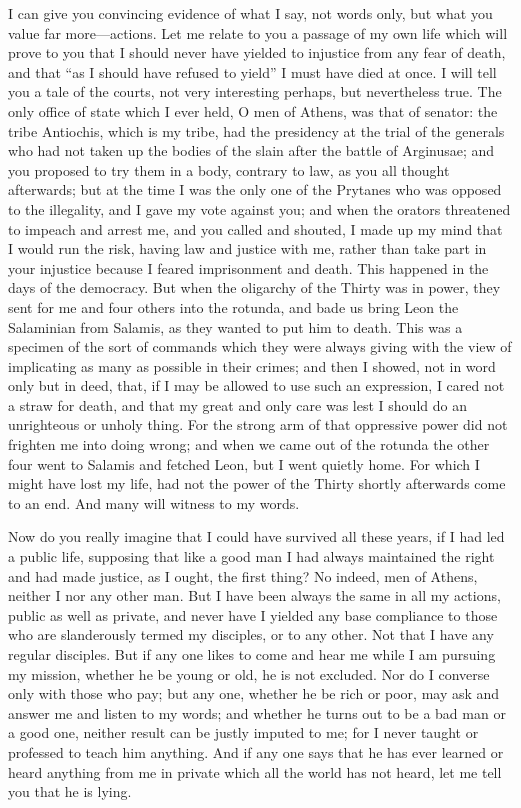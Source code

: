 \documentclass[11pt,letter]{article}
\begin{document}
\par  I can give you convincing evidence of what I say, not words only, but what you value far more—actions. Let me relate to you a passage of my own life which will prove to you that I should never have yielded to injustice from any fear of death, and that “as I should have refused to yield” I must have died at once. I will tell you a tale of the courts, not very interesting perhaps, but nevertheless true. The only office of state which I ever held, O men of Athens, was that of senator: the tribe Antiochis, which is my tribe, had the presidency at the trial of the generals who had not taken up the bodies of the slain after the battle of Arginusae; and you proposed to try them in a body, contrary to law, as you all thought afterwards; but at the time I was the only one of the Prytanes who was opposed to the illegality, and I gave my vote against you; and when the orators threatened to impeach and arrest me, and you called and shouted, I made up my mind that I would run the risk, having law and justice with me, rather than take part in your injustice because I feared imprisonment and death. This happened in the days of the democracy. But when the oligarchy of the Thirty was in power, they sent for me and four others into the rotunda, and bade us bring Leon the Salaminian from Salamis, as they wanted to put him to death. This was a specimen of the sort of commands which they were always giving with the view of implicating as many as possible in their crimes; and then I showed, not in word only but in deed, that, if I may be allowed to use such an expression, I cared not a straw for death, and that my great and only care was lest I should do an unrighteous or unholy thing. For the strong arm of that oppressive power did not frighten me into doing wrong; and when we came out of the rotunda the other four went to Salamis and fetched Leon, but I went quietly home. For which I might have lost my life, had not the power of the Thirty shortly afterwards come to an end. And many will witness to my words.

\par  Now do you really imagine that I could have survived all these years, if I had led a public life, supposing that like a good man I had always maintained the right and had made justice, as I ought, the first thing? No indeed, men of Athens, neither I nor any other man. But I have been always the same in all my actions, public as well as private, and never have I yielded any base compliance to those who are slanderously termed my disciples, or to any other. Not that I have any regular disciples. But if any one likes to come and hear me while I am pursuing my mission, whether he be young or old, he is not excluded. Nor do I converse only with those who pay; but any one, whether he be rich or poor, may ask and answer me and listen to my words; and whether he turns out to be a bad man or a good one, neither result can be justly imputed to me; for I never taught or professed to teach him anything. And if any one says that he has ever learned or heard anything from me in private which all the world has not heard, let me tell you that he is lying.
\end{document}
